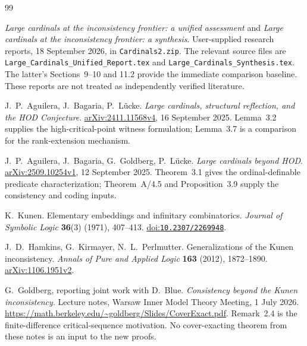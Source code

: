 \documentclass[11pt,letterpaper]{article}
\theoremstyle{definition}
\numberwithin{equation}{section}
\newcommand{\arxiv}[1]{\href{https://arxiv.org/abs/#1}{arXiv:#1}}
\newcommand{\doi}[1]{\href{https://doi.org/#1}{doi:\nolinkurl{#1}}}
\begin{document}
\clearpage
{}
{}
\begin{thebibliography}{99}
\small
\setlength{\itemsep}{6pt}

\emph{Large cardinals at the inconsistency frontier: a unified assessment} and \emph{Large cardinals at the inconsistency frontier: a synthesis}. User-supplied research reports, 18 September 2026, in \nolinkurl{Cardinals2.zip}. The relevant source files are \nolinkurl{Large_Cardinals_Unified_Report.tex} and \nolinkurl{Large_Cardinals_Synthesis.tex}. The latter's Sections~9--10 and 11.2 provide the immediate comparison baseline. These reports are not treated as independently verified literature.

J.~P.~Aguilera, J.~Bagaria, P.~L\"ucke.
\emph{Large cardinals, structural reflection, and the HOD Conjecture}.
\arxiv{2411.11568v4}, 16 September 2025.
Lemma~3.2 supplies the high-critical-point witness formulation; Lemma~3.7 is a comparison for the rank-extension mechanism.

J.~P.~Aguilera, J.~Bagaria, G.~Goldberg, P.~L\"ucke.
\emph{Large cardinals beyond HOD}.
\arxiv{2509.10254v1}, 12 September 2025.
Theorem~3.1 gives the ordinal-definable predicate characterization; Theorem~A/4.5 and Proposition~3.9 supply the consistency and coding inputs.

K.~Kunen. Elementary embeddings and infinitary combinatorics.
\emph{Journal of Symbolic Logic} \textbf{36}(3) (1971), 407--413.
\doi{10.2307/2269948}.

J.~D.~Hamkins, G.~Kirmayer, N.~L.~Perlmutter.
Generalizations of the Kunen inconsistency.
\emph{Annals of Pure and Applied Logic} \textbf{163} (2012), 1872--1890.
\arxiv{1106.1951v2}.

G.~Goldberg, reporting joint work with D.~Blue.
\emph{Consistency beyond the Kunen inconsistency}.
Lecture notes, Warsaw Inner Model Theory Meeting, 1 July 2026.
\url{https://math.berkeley.edu/~goldberg/Slides/CoverExact.pdf}.
Remark~2.4 is the finite-difference critical-sequence motivation. No cover-exacting theorem from these notes is an input to the new proofs.

\end{thebibliography}
\end{document}
